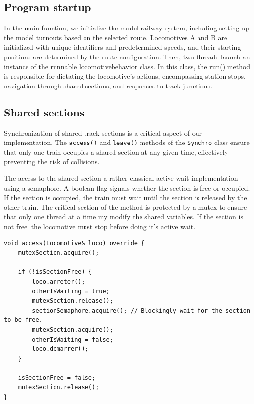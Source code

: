 \documentclass{article}
\begin{document}
    \subsection{Program startup}

    In the main function, we initialize the model railway system, including setting up the model turnouts based on the selected route. Locomotives A and B are initialized with unique identifiers and predetermined speeds, and their starting positions are determined by the route configuration. Then, two threads launch an instance of the runnable locomotivebehavior class. In this class, the run() method is responsible for dictating the locomotive's actions, encompassing station stops, navigation through shared sections, and responses to track junctions.

    \subsection{Shared sections}
    Synchronization of shared track sections is a critical aspect of our implementation. The \texttt{access()} and \texttt{leave()} methods of the \texttt{Synchro} class ensure that only one train occupies a shared section at any given time, effectively preventing the risk of collisions.

    The access to the shared section a rather classical active wait implementation using a semaphore. A boolean flag signals whether the section is free or occupied. If the section is occupied, the train must wait until the section is released by the other train. The critical section of the method is protected by a mutex to ensure that only one thread at a time my modify the shared variables. If the section is not free, the locomotive must stop before doing it's active wait.

    \begin{lstlisting}[caption={The shared section access routine.}, captionpos=b, label=lst:1]
void access(Locomotive& loco) override {
    mutexSection.acquire();

    if (!isSectionFree) {
        loco.arreter();
        otherIsWaiting = true;
        mutexSection.release();
        sectionSemaphore.acquire(); // Blockingly wait for the section to be free.
        mutexSection.acquire();
        otherIsWaiting = false;
        loco.demarrer();
    }

    isSectionFree = false;
    mutexSection.release();
}
    \end{lstlisting}
\end{document}
